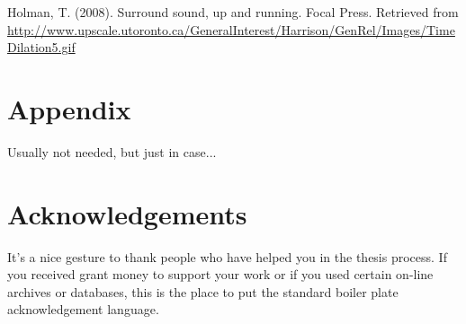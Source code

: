 \documentclass[twocolumn,12pt]{article}
\begin{document}




\begin{thebibliography}{99}

Holman, T. (2008). Surround sound, up and running. Focal Press.
Retrieved from \url{http://www.upscale.utoronto.ca/GeneralInterest/Harrison/GenRel/Images/TimeDilation5.gif}  
\end{thebibliography}

\section{Appendix}

Usually not needed, but just in case...

\section{Acknowledgements}
It's a nice gesture to thank people who have helped you in the thesis process.  If you received grant money to support your work or if you used certain on-line archives or databases, this is the place to put the standard boiler plate acknowledgement language.
\end{document}
